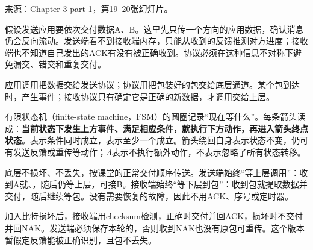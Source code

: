 来源：Chapter 3 part 1，第19–20张幻灯片。








假设发送应用要依次交付数据A、B。这里先只传一个方向的应用数据，确认消息仍会反向流动。发送端看不到接收端内存，只能从收到的反馈推测对方进度；接收端也不知道自己发出的ACK有没有被正确收到。协议必须在这种信息不对称下避免漏交、错交和重复交付。





应用调用把数据交给发送协议；协议用把包装好的包交给底层通道。某个包到达时，产生事件；接收协议只有确定它是正确的新数据，才调用交给上层。


有限状态机（finite-state machine，FSM）的圆圈记录“现在等什么”。每条箭头读成：\textbf{当前状态下发生上方事件、满足相应条件，就执行下方动作，再进入箭头终点状态}。\StudyInline{\&\&}表示条件同时成立，\StudyInline{||}表示至少一个成立。箭头绕回自身表示状态不变，仍可有发送反馈或重传等动作；\ensuremath{\Lambda}表示不执行额外动作，不表示忽略了所有状态转移。





底层不损坏、不丢失，按课堂的正常交付顺序传送。发送端始终“等上层调用”：收到A就、，随后仍等上层，可接B。接收端始终“等下层到包”：收到包就提取数据并交付，随后继续等包。没有需要恢复的故障，因此不用ACK、序号或定时器。





加入比特损坏后，接收端用checksum检测，正确时交付并回ACK，损坏时不交付并回NAK。发送端必须保存本轮的，否则收到NAK也没有原包可重传。这个版本暂假定反馈能被正确识别，且包不丢失。


